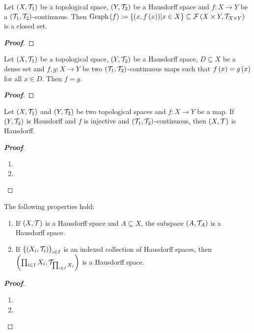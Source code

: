 \begin{proposition}
  Let $\left(X,\mathcal{T}_1\right)$ be a topological space, $\left(Y,\mathcal{T}_2\right)$ be a Hausdorff space and $f:X\rightarrow Y$ be a $\left(\mathcal{T}_1,\mathcal{T}_2\right)$-continuous. Then $\text{Graph}\left(f\right):=\left\{\left(x,f\left(x\right)\right)\middle|x\in X\right\}\subseteq\mathcal{F}\left(X\times Y,\mathcal{T}_{X\times Y}\right)$ is a closed set.

  \begin{proof}[\rm\textbf{Proof}]
    
  \end{proof}
\end{proposition}

\begin{corollary}
  Let $\left(X,\mathcal{T}_1\right)$ be a topological space, $\left(Y,\mathcal{T}_2\right)$ be a Hausdorff space, $D\subseteq X$ be a dense set and $f,g:X\rightarrow Y$ be two $\left(\mathcal{T}_1,\mathcal{T}_2\right)$-continuous maps such that $f\left(x\right)=g\left(x\right)$ for all $x\in D$. Then $f=g$.

  \begin{proof}[\rm\textbf{Proof}]
    
  \end{proof}
\end{corollary}

\begin{proposition}
  Let $\left(X,\mathcal{T}_1\right)$ and $\left(Y,\mathcal{T}_2\right)$ be two topological spaces and $f:X\rightarrow Y$ be a map. If $\left(Y,\mathcal{T}_2\right)$ is Hausdorff and $f$ is injective and $\left(\mathcal{T}_1,\mathcal{T}_2\right)$-continuous, then $\left(X,\mathcal{T}\right)$ is Hausdorff.

  \begin{proof}[\rm\textbf{Proof}]
    \hfill
    \begin{enumerate}
      \item[\boxed{\Rightarrow}]
      \item[\boxed{\Leftarrow}]
    \end{enumerate}
  \end{proof}
\end{proposition}

\begin{proposition}
  The following properties hold:

  \begin{enumerate}
    \item If $\left(X,\mathcal{T}\right)$ is a Hausdorff space and $A\subseteq X$, the subspace $\left(A,\mathcal{T}_A\right)$ is a Hausdorff space.
    \item If $\left\{\left(X_i,\mathcal{T}_i\right)\right\}_{i\in I}$ is an indexed collection of Hausdorff spaces, then $\left(\prod_{i\in I}{X_i},\mathcal{T}_{\prod_{i\in I}{X_i}}\right)$ is a Hausdorff space.
  \end{enumerate}
  
  \begin{proof}[\rm\textbf{Proof}]
    \hfill
    \begin{enumerate}
      \item 
      \item 
    \end{enumerate}
  \end{proof}
\end{proposition}

